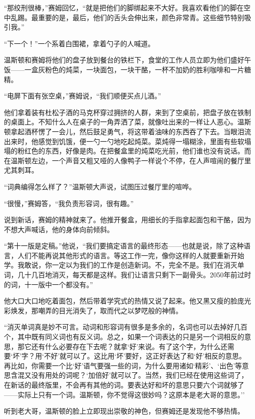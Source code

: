 ``那绞刑很棒，''赛姆回忆，``就是把他们的脚绑起来不大好。我喜欢看他们的脚在空中乱踢。最重要的是，最后，他们的舌头会伸出来，颜色非常青。这些细节特别吸引我。''

``下一个！''一个系着白围裙，拿着勺子的人喊道。

温斯顿和赛姆将他们的盘子放到餐台的铁栏下，食堂的工作人员立即为他们盛好午饭------一盒灰粉色的炖菜，一块面包，一块干酪，一杯不加奶的胜利咖啡和一片糖精。

``电屏下面有张空桌，''赛姆说，``我们顺便买点儿酒。''

他们拿着装有杜松子酒的马克杯穿过拥挤的人群，来到了空桌前，把盘子放在铁制的桌面上。不知什么人在桌子的一角弄洒了菜，就像吐出来的一样让人恶心。温斯顿拿起酒杯愣了一会儿，然后鼓足勇气，将这带着油味的东西吞了下去。当眼泪流出来时，他感觉到饥饿，便一勺一勺地吃起炖菜。菜炖得一塌糊涂，里面有些软塌塌的粉红色的东西，好像是肉。在把餐盒里的炖菜吃光前，他们谁也没有说话。而在温斯顿左边，一个声音又粗又哑的人像鸭子一样说个不停，在人声喧闹的餐厅里尤其刺耳。

``词典编得怎么样了？''温斯顿大声说，试图压过餐厅里的喧哗。

``很慢，''赛姆答，``我负责形容词，很有趣。''

说到新话，赛姆的精神就来了。他推开餐盒，用细长的手指拿起面包和干酪，因为不想大声喊话，他的身体向前倾斜。

``第十一版是定稿。''他说，``我们要搞定语言的最终形态------也就是说，除了这种语言，人们不能再说其他形式的语言。等这工作一完，像你这样的人就要重新开始学。我敢说，你一定以为我们的工作是创造新词。不，完全不是。我们在消灭单词，几十几百地消灭，每天都是这样。我们让语言只剩下一副骨头。2050年前过时的词，十一版中一个都没有。''

他大口大口地吃着面包，然后带着学究式的热情又说了起来。他又黑又瘦的脸庞光彩焕发，那嘲弄的目光消失了，取而代之以梦呓般的神情。

``消灭单词真是妙不可言。动词和形容词有很多是多余的，名词也可以去掉好几百个，其中既有同义词也有反义词。总之，如果一个词表达的只是另一个词相反的意思，那它还有什么必要存在下去呢？就拿`好'来说。有了这个字，为什么还需要`坏'字？用`不好'就可以了。这比用`坏'要好，这正好表达了和`好'相反的意思。再比如，你需要一个比`好'语气要强一些的词，为什么要用诸如`精彩'、`出色'等意思含混又没有用处的词呢？`加倍好'就可以了。当然，我们已经在使用这些词了，在新话的最终版里，不会再有其他的词。要表达好和坏的意思只要六个词就够了------实际上只有一个词。温斯顿，你不觉得这很妙吗？这原本是老大哥的意思。''

听到老大哥，温斯顿的脸上立即现出崇敬的神色，但赛姆还是发现他不够热情。

